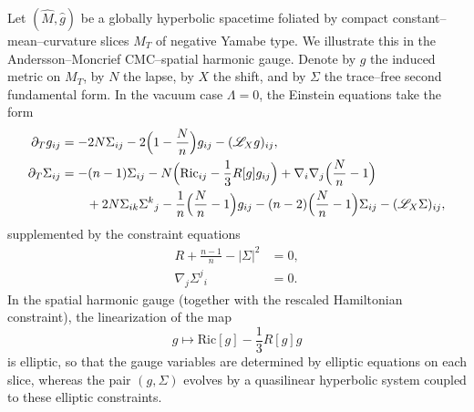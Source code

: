\documentclass{amsart}
\begin{document}
\noindent Let \((\widehat M,\widehat g)\) be a globally hyperbolic spacetime foliated by compact constant--mean--curvature slices \(M_T\) of negative Yamabe type.  We illustrate this in the Andersson--Moncrief CMC--spatial harmonic gauge.  Denote by \(g\) the induced metric on \(M_T\), by \(N\) the lapse, by \(X\) the shift, and by \(\Sigma\) the trace--free second fundamental form.  In the vacuum case \(\Lambda=0\), the Einstein equations take the form
\begin{align}
\partial_T g_{ij}
 &= -2N\Sigma_{ij}
    -2\Bigl(1-\frac{N}{n}\Bigr)g_{ij}
    -(\mathscr L_X g)_{ij}, \label{eq:intro_metric_vac}\\
\partial_T \Sigma_{ij}
 &= -(n-1)\Sigma_{ij}
    -N\Bigl(\text{Ric}_{ij}-\frac{1}{3}R[g]g_{ij}\Bigr)
    +\nabla_i\nabla_j\Bigl(\frac{N}{n}-1\Bigr) \nonumber\\
 &\qquad
    +2N\Sigma_{ik}\Sigma^{k}{}_{j}
    -\frac1n\Bigl(\frac{N}{n}-1\Bigr)g_{ij}
    -(n-2)\Bigl(\frac{N}{n}-1\Bigr)\Sigma_{ij}
    -(\mathscr L_X\Sigma)_{ij}, \label{eq:intro_sigma_vac}
\end{align}
supplemented by the constraint equations
\begin{align}
R+\frac{n-1}{n}-|\Sigma|^2 &=0, \label{eq:intro_ham_vac}\\
\nabla_j\Sigma^j{}_i &=0. \label{eq:intro_mom_vac}
\end{align}
In the spatial harmonic gauge (together with the rescaled Hamiltonian constraint), the linearization of the map
\[
g\longmapsto \text{Ric}[g]-\frac{1}{3}R[g]g
\]
is elliptic, so that the gauge variables are determined by elliptic equations on each slice, whereas the pair \((g,\Sigma)\) evolves by a quasilinear hyperbolic system coupled to these elliptic constraints.

\medskip
\end{document}

